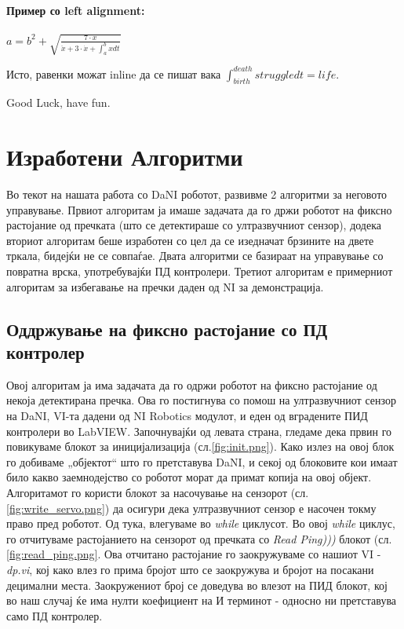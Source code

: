 \documentclass{article}
\begin{document}
\paragraph{Пример со left alignment:}
\begin{flushleft}
$ a = b^2 + \sqrt{\frac{7 \cdot x}{{\ddot x + 3 \cdot \dot x + \int_a^b{x dt}}}} $
\end{flushleft}

Исто, равенки можат inline да се пишат вака $\int_{birth}^{death}{struggle dt} = life $.

Good Luck, have fun.
\newpage
\section{Изработени Алгоритми}
Во текот на нашата работа со DaNI роботот, развивме 2 алгоритми за неговото управување. Првиот алгоритам ја имаше задачата да го држи роботот на фиксно растојание од пречката (што се детектираше со ултразвучниот сензор), додека вториот алгоритам беше изработен со цел да се изедначат брзините на двете тркала, бидејќи не се совпаѓае. Двата алгоритми се базираат на управување со повратна врска, употребувајќи ПД контролери. Третиот алгоритам е примерниот алгоритам за избегавање на пречки даден од NI за демонстрација. 

\subsection{Оддржување на фиксно растојание со ПД контролер}
Овој алгоритам ја има задачата да го одржи роботот на фиксно растојание од некоја детектирана пречка. Ова го постигнува со помош на ултразвучниот сензор на DaNI, VI-та дадени од NI Robotics модулот, и еден од вградените ПИД контролери во LabVIEW. Започнувајќи од левата страна, гледаме дека првин го повикуваме блокот за иницијализација (сл.\ref{fig:init.png}). Како излез на овој блок го добиваме „објектот“ што го претставува DaNI, и секој од блоковите кои имаат било какво заемнодејство со роботот морат да примат копија на овој објект.
Алгоритамот го користи блокот за насочување на сензорот (сл.\ref{fig:write_servo.png}) да осигури дека ултразвучниот сензор е насочен токму право пред роботот. Од тука, влегуваме во \textit{while} циклусот. Во овој \textit{while} циклус, го отчитуваме растојанието на сензорот од пречката со \textit{Read Ping)))} блокот (сл.\ref{fig:read_ping.png}. Ова отчитано растојание го заокружуваме со нашиот VI - \textit{dp.vi}, кој како влез го прима бројот што се заокружува и бројот на посакани децимални места. Заокружениот број се доведува во влезот на ПИД блокот, кој во наш случај ќе има нулти коефициент на И терминот - односно ни претставува само ПД контролер.
\end{document}

